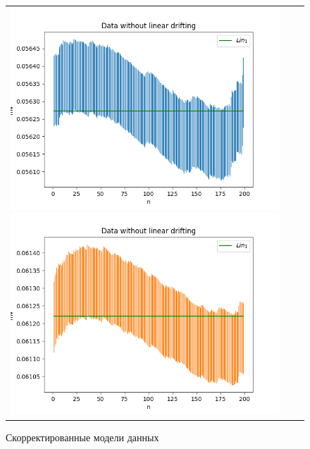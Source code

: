 \documentclass[../main.tex]{subfiles}
\begin{document}
\begin{figure}[H]
	\begin{tabular}{ccc}
		\includegraphics[scale=0.5]{figures/fixed_PR1.png}
		\includegraphics[scale=0.5]{figures/fixed_PR2.png}
	\end{tabular}
	\caption{Скорректированные модели данных} 
\end{figure}
\end{document}
